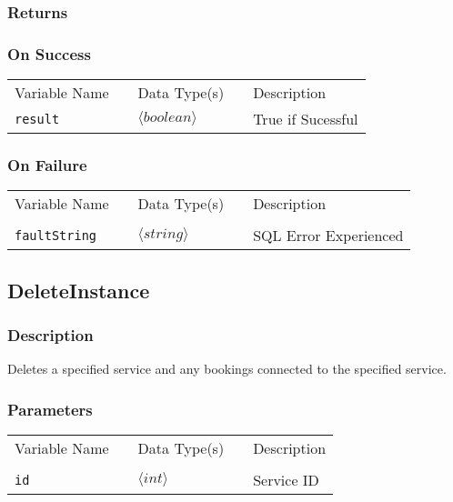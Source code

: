 \subsubsection{Returns}

\subsubsection{On Success}

\begin{tabular}{lllll}
Variable Name	&		&	Data Type(s)		&	&	Description	\\
\verb!result! & \hspace{15mm} & $\langle boolean\rangle $ & \hspace{15mm} & True if Sucessful \\
\end{tabular}

\subsubsection{On Failure}

\begin{tabular}{lllll}
Variable Name	&		&	Data Type(s)		&	&	Description	\\
				&	&	&	&	\\
\verb!faultString! & \hspace{15mm} & $\langle string\rangle $ & \hspace{15mm} & SQL Error Experienced \\
\end{tabular}


\subsection{DeleteInstance}

\subsubsection{Description}

Deletes a specified service and any bookings connected to the specified
service.

\subsubsection{Parameters}

\begin{tabular}{lllll}
Variable Name	&		&	Data Type(s)		&	&	Description	\\
				&	&	&	&	\\
\verb!id! & \hspace{15mm} & $\langle int\rangle $ & \hspace{15mm} & Service ID \\
\end{tabular}

